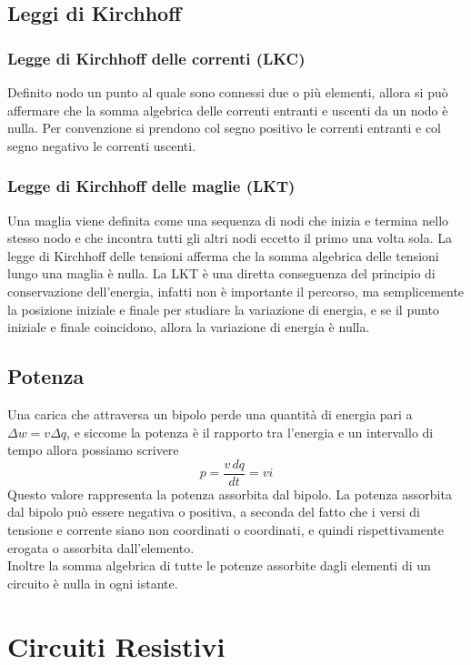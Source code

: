 \documentclass[a4paper,12pt]{article}
\begin{document}
\subsection{Leggi di Kirchhoff}
\subsubsection{Legge di Kirchhoff delle correnti (LKC)}
Definito nodo un punto al quale sono connessi due o più elementi, allora si può affermare che la somma algebrica delle correnti entranti e uscenti da un nodo è nulla. Per convenzione si prendono col segno positivo le correnti entranti e col segno negativo le correnti uscenti.
\subsubsection{Legge di Kirchhoff delle maglie (LKT)}
Una maglia viene definita come una sequenza di nodi che inizia e termina nello stesso nodo e che incontra tutti gli altri nodi eccetto il primo una volta sola. La legge di Kirchhoff delle tensioni afferma che la somma algebrica delle tensioni lungo una maglia è nulla.
La LKT è una diretta conseguenza del principio di conservazione dell'energia, infatti non è importante il percorso, ma semplicemente la posizione iniziale e finale per studiare la variazione di energia, e se il punto iniziale e finale coincidono, allora la variazione di energia è nulla.
\subsection{Potenza}
Una carica che attraversa un bipolo perde una quantità di energia pari a $\Delta w = v \Delta q$, e siccome la potenza è il rapporto tra l'energia e un intervallo di tempo allora possiamo scrivere 
$$p = \frac{v \, dq}{dt} = vi$$
Questo valore rappresenta la potenza assorbita dal bipolo. La potenza assorbita dal bipolo può essere negativa o positiva, a seconda del fatto che i versi di tensione e corrente siano non coordinati o coordinati, e quindi rispettivamente erogata o assorbita dall'elemento. \\
Inoltre la somma algebrica di tutte le potenze assorbite dagli elementi di un circuito è nulla in ogni istante.
\section{Circuiti Resistivi}
\end{document}
